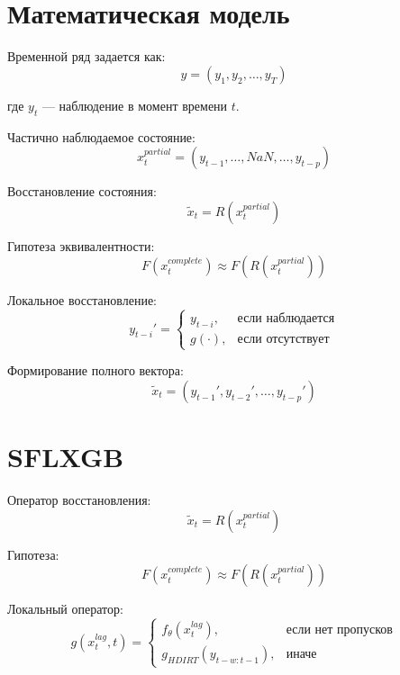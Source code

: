 \documentclass[conference]{IEEEtran}
\begin{document}
\section{Математическая модель}

Временной ряд задается как:
\begin{equation}
y = (y_1, y_2, \dots, y_T)
\end{equation}

где $y_t$ — наблюдение в момент времени $t$.

Частично наблюдаемое состояние:
\begin{equation}
x_t^{partial} = (y_{t-1}, \dots, NaN, \dots, y_{t-p})
\end{equation}

Восстановление состояния:
\begin{equation}
\tilde{x}_t = R(x_t^{partial})
\end{equation}

Гипотеза эквивалентности:
\begin{equation}
F(x_t^{complete}) \approx F(R(x_t^{partial}))
\end{equation}

Локальное восстановление:
\begin{equation}
y_{t-i}' =
\begin{cases}
y_{t-i}, & \text{если наблюдается} \\
g(\cdot), & \text{если отсутствует}
\end{cases}
\end{equation}

Формирование полного вектора:
\begin{equation}
\tilde{x}_t = (y_{t-1}', y_{t-2}', \dots, y_{t-p}')
\end{equation}

\section{SFLXGB}

Оператор восстановления:
\begin{equation}
\tilde{x}_t = R(x_t^{partial})
\end{equation}

Гипотеза:
\begin{equation}
F(x_t^{complete}) \approx F(R(x_t^{partial}))
\end{equation}

Локальный оператор:
\begin{equation}
g(x_t^{lag}, t) =
\begin{cases}
f_\theta(x_t^{lag}), & \text{если нет пропусков} \\
g_{HDIRT}(y_{t-w:t-1}), & \text{иначе}
\end{cases}
\end{equation}
\end{document}
